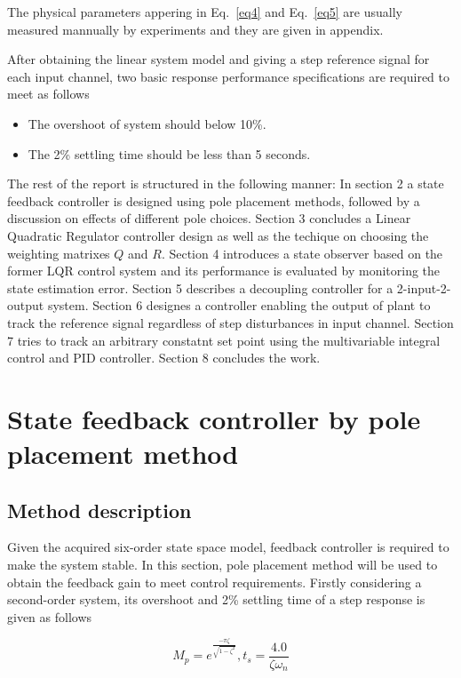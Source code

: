\documentclass[hyperref]{article}
\theoremstyle{nonumberplain}
\begin{document}
	The physical parameters appering in Eq.~\ref{eq4} and Eq.~\ref{eq5} are usually measured mannually by experiments and they are given in appendix.
	
	After obtaining the linear system model and giving a step reference signal for each input channel, two basic response performance specifications are required to meet as follows
	
	\begin{itemize}
		\item The overshoot of system should below 10\%.
		\item The 2\% settling time should be less than 5 seconds.
	\end{itemize}

	The rest of the report is structured in the following manner: In section 2 a state feedback controller is designed using pole placement methods, followed by a discussion on effects of different pole choices. Section 3 concludes a Linear Quadratic Regulator controller design as well as the techique on choosing the weighting matrixes $Q$ and $R$. Section 4 introduces a state observer based on the former LQR control system and its performance is evaluated by monitoring the state estimation error. Section 5 describes a decoupling controller for a 2-input-2-output system. Section 6 designes a controller enabling the output of plant to track the reference signal regardless of step disturbances in input channel. Section 7 tries to track an arbitrary constatnt set point using the multivariable integral control and PID controller. Section 8 concludes the work.
	
	\section{State feedback controller by pole placement method}
	
	\subsection{Method description}
	
	\hspace{1.0em}
	Given the acquired six-order state space model, feedback controller is required to make the system stable. In this section, pole placement method will be used to obtain the feedback gain to meet control requirements. Firstly considering a second-order system, its overshoot and 2\% settling time of a step response is given as follows
	
	\begin{equation}
	M_{p}=e^{\frac{-\pi \zeta }{\sqrt{1-\zeta ^{2}}}}, t_{s}=\frac{4.0}{\zeta \omega _{n}}
	\label{eq6}
	\end{equation}
	
\end{document}
